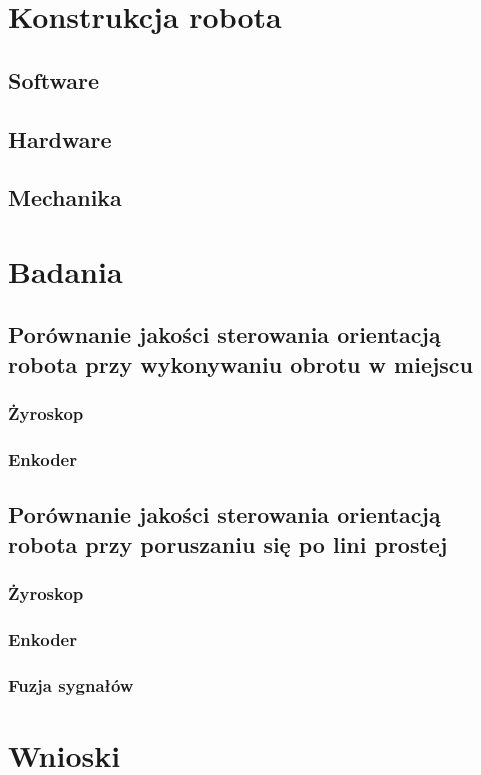\documentclass[12pt,a4paper,twoside,openright,fleqn]{mwrep}
\begin{document}
\chapter{Konstrukcja robota} %
\section{Software} 
\section{Hardware} 
\section{Mechanika} 
\chapter{Badania} %
\section{Porównanie jakości sterowania orientacją robota przy wykonywaniu obrotu w miejscu} 
\subsection{Żyroskop} 
\subsection{Enkoder} 
\section{Porównanie jakości sterowania orientacją robota przy poruszaniu się po lini prostej} 
\subsection{Żyroskop} 
\subsection{Enkoder} 
\subsection{Fuzja sygnałów} 
\chapter{Wnioski} %
\label{cha:Wnioski}

\label{cha:Badania}

\label{cha:Konstrukcja robota -}



%
%
\end{document}
